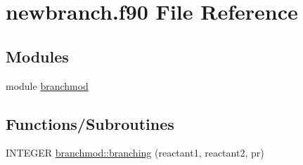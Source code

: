 \hypertarget{newbranch_8f90}{
\section{newbranch.f90 File Reference}
\label{newbranch_8f90}
}
\subsection*{Modules}
\begin{DoxyCompactItemize}
\item 
module \hyperlink{namespacebranchmod}{branchmod}
\end{DoxyCompactItemize}
\subsection*{Functions/Subroutines}
\begin{DoxyCompactItemize}
\item 
INTEGER \hyperlink{namespacebranchmod_afe047e9cf349dd7beea43ce0113ab24b}{branchmod::branching} (reactant1, reactant2, pr)
\end{DoxyCompactItemize}
